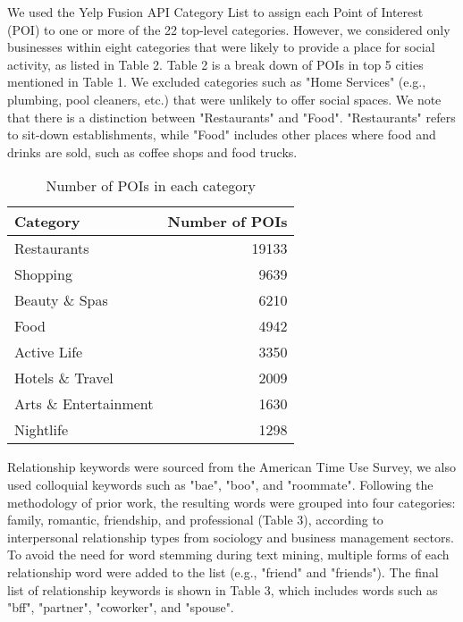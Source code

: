 We used the Yelp Fusion API Category List\cite{b9} to assign each Point of Interest (POI) to one or more of the 22 top-level categories. However, we considered only businesses within eight categories that were likely to provide a place for social activity, as listed in Table 2. Table 2 is a break down of POIs in top 5 cities mentioned in Table 1. We excluded categories such as "Home Services" (e.g., plumbing, pool cleaners, etc.) that were unlikely to offer social spaces. We note that there is a distinction between "Restaurants" and "Food". "Restaurants" refers to sit-down establishments, while "Food" includes other places where food and drinks are sold, such as coffee shops and food trucks.

\begin{table}[h]
    \centering
    \caption{Number of POIs in each category}
    \small
    \begin{tabular}{|l|r|}
        \hline
        Category & Number of POIs \\
        \hline
        Restaurants & 19133 \\
        Shopping & 9639 \\
        Beauty \& Spas & 6210 \\
        Food & 4942 \\
        Active Life & 3350 \\
        Hotels \& Travel & 2009 \\
        Arts \& Entertainment & 1630 \\
        Nightlife & 1298 \\
        \hline
    \end{tabular}
    \label{tab:businesses}
\end{table}

Relationship keywords were sourced from the American Time Use Survey\cite{b7}, we also used colloquial keywords such as "bae", "boo", and "roommate". Following the methodology of prior work\cite{b2}, the resulting words were grouped into four categories: family, romantic, friendship, and professional (Table 3), according to interpersonal relationship types from sociology and business management sectors. To avoid the need for word stemming during text mining, multiple forms of each relationship word were added to the list (e.g., "friend" and "friends"). The final list of relationship keywords is shown in Table 3, which includes words such as "bff", "partner", "coworker", and "spouse".

